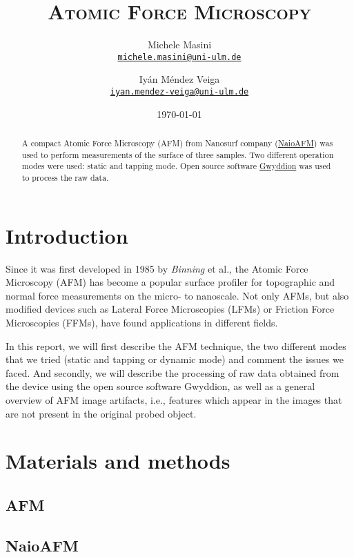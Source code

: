 \documentclass[11pt,a4paper]{article}
\title{\bfseries\textsc{Atomic Force Microscopy}}
\author{
Michele Masini\\ \small\texttt{\href{mailto:michele.masini@uni-ulm.de}{michele.masini@uni-ulm.de}}\and
Iyán Méndez Veiga\\ \small\texttt{\href{mailto:iyan.mendez-veiga@uni-ulm.de}{iyan.mendez-veiga@uni-ulm.de}}
}
\date{\today}
\begin{document}
\maketitle

\begin{abstract}
A compact Atomic Force Microscopy (AFM) from Nanosurf company (\href{https://www.nanosurf.com/en/products/naioafm-the-leading-compact-afm}{NaioAFM}) was used to perform measurements of the surface of three samples. Two different operation modes were used: static and tapping mode. Open source software \href{http://gwyddion.net/}{Gwyddion} was used to process the raw data.
\end{abstract}

\vspace{1.5cm}

\section{Introduction}

Since it was first developed in 1985 by \emph{Binning} et al., the Atomic Force Microscopy (AFM) \cite{Bhushan} has become a popular surface profiler for topographic and normal force measurements on the micro- to nanoscale. Not only AFMs, but also modified devices such as Lateral Force Microscopies (LFMs) or Friction Force Microscopies (FFMs), have found applications in different fields.

In this report, we will first describe the AFM technique, the two different modes that we tried (static and tapping or dynamic mode) and comment the issues we faced. And secondly, we will describe the processing of raw data obtained from the device using the open source software Gwyddion, as well as a general overview of AFM image artifacts, i.e., features which appear in the images that are not present in the original probed object.

\section{Materials and methods}

\subsection{AFM}

\subsection{NaioAFM}
\end{document}
